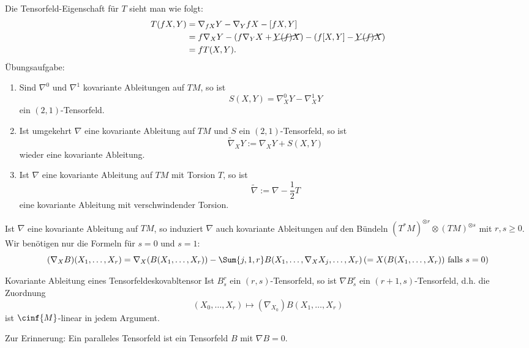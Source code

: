 Die Tensorfeld-Eigenschaft für $T$ sieht man wie folgt:
\begin{align}
T(fX, Y) &= \nabla_{fX} Y - \nabla_Y fX - [fX, Y]\\
&= f \nabla_X Y - (f \nabla_Y X + \cancel{Y(f) X}) - (f [X, Y] - \cancel{Y(f)X})\\
&= f T(X,Y).
\end{align}
Übungsaufgabe:
\begin{enumerate}
\item Sind $\nabla^0$ und $\nabla^1$ kovariante Ableitungen auf $TM$, so ist 
\begin{equation}
S(X,Y) = \nabla^0_X Y - \nabla^1_X Y
\end{equation}
ein $(2,1)$-Tensorfeld.
\item Ist umgekehrt $\nabla$ eine kovariante Ableitung auf $TM$ und $S$ ein $(2,1)$-Tensorfeld, so ist
\begin{equation}
\tilde{\nabla}_X Y := \nabla_X Y + S(X,Y)
\end{equation}
wieder eine kovariante Ableitung.
\item Ist $\nabla$ eine kovariante Ableitung auf $TM$ mit Torsion $T$, so ist
\begin{equation}
\tilde{\nabla} := \nabla - \frac{1}{2} T
\end{equation}
eine kovariante Ableitung mit verschwindender Torsion.
\end{enumerate}
\begin{bemerkung}
Ist $\nabla$ eine kovariante Ableitung auf $TM$, so induziert $\nabla$ auch kovariante Ableitungen auf den Bündeln $(T^\ast M)^{\otimes r} \otimes (TM)^{\otimes s}$ mit $r, s \geq 0$. Wir benötigen nur die Formeln für $s=0$ und $s=1$:
\begin{equation}
(\nabla_X B)(X_1, \dots, X_r) = \nabla_X (B(X_1, \dots, X_r)) - \Sum{j,1,r} B(X_1, \dots, \nabla_X X_j, \dots, X_r) \left( = X(B(X_1, \dots, X_r)) \ \text{falls} \ s=0\right)
\end{equation}
\end{bemerkung}
\begin{satz}{Kovariante Ableitung eines Tensorfeldes}{kovabltensor}
Ist $B^r_s$ ein $(r,s)$-Tensorfeld, so ist $\nabla B^r_s$ ein $(r+1, s)$-Tensorfeld, d.h. die Zuordnung
\begin{equation}
(X_0, \dots, X_r) \mapsto (\nabla_{X_0}) B(X_1, \dots, X_r)
\end{equation}
ist $\cinf{M}$-linear in jedem Argument.
\end{satz}
Zur Erinnerung: Ein paralleles Tensorfeld ist ein Tensorfeld $B$ mit $\nabla B = 0$.\\
